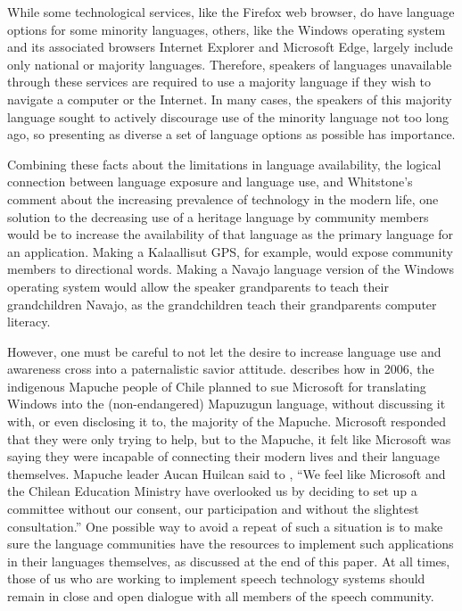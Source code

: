 \documentclass[12pt]{article}
\begin{document}
While some technological services, like the Firefox web browser, do have language options for some minority languages, others, like the Windows operating system and its associated browsers Internet Explorer and Microsoft Edge, largely include only national or majority languages. Therefore, speakers of languages unavailable through these services are required to use a majority language if they wish to navigate a computer or the Internet. In many cases, the speakers of this majority language sought to actively discourage use of the minority language not too long ago, so presenting as diverse a set of language options as possible has importance. \par

Combining these facts about the limitations in language availability, the logical connection between language exposure and language use, and Whitstone's comment about the increasing prevalence of technology in the modern life, one solution to the decreasing use of a heritage language by community members would be to increase the availability of that language as the primary language for an application. Making a Kalaallisut GPS, for example, would expose community members to directional words. Making a Navajo language version of the Windows operating system would allow the speaker grandparents to teach their grandchildren Navajo, as the grandchildren teach their grandparents computer literacy. \par

However, one must be careful to not let the desire to increase language use and awareness cross into a paternalistic savior attitude. \citet{endng} describes how in 2006, the indigenous Mapuche people of Chile planned to sue Microsoft for translating Windows into the (non-endangered) Mapuzugun language, without discussing it with, or even disclosing it to, the majority of the Mapuche. Microsoft responded that they were only trying to help, but to the Mapuche, it felt like Microsoft was saying they were incapable of connecting their modern lives and their language themselves. Mapuche leader Aucan Huilcan said to \citet{ms_news}, ``We feel like Microsoft and the Chilean Education Ministry have overlooked us by deciding to set up a committee without our consent, our participation and without the slightest consultation.'' One possible way to avoid a repeat of such a situation is to make sure the language communities have the resources to implement such applications in their languages themselves, as discussed at the end of this paper. At all times, those of us who are working to implement speech technology systems should remain in close and open dialogue with all members of the speech community. \par
\end{document}
